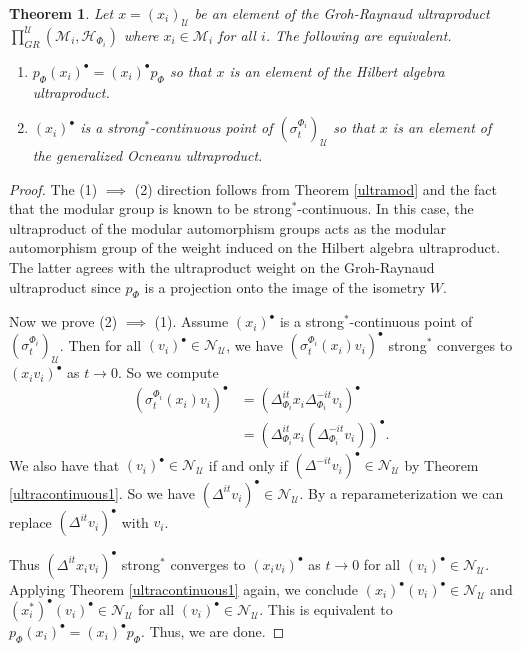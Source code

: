 \documentclass[12pt]{amsart}
\newtheorem{thm}{Theorem}[section]
\theoremstyle{definition}
\def\cal{\mathcal}
\newcommand\cU{{\cal U}}
\begin{document}
\begin{thm}\label{ultracontinuous2}
    Let $x = (x_i)_{\cU}$ be an element of the Groh-Raynaud ultraproduct $\prod^{\cU}_{GR} (\cal M_i, \cal H_{\Phi_i})$ where $x_i \in \cal M_i$ for all $i$.  The following are equivalent.
    \begin{enumerate}
        \item $p_{\Phi} (x_i)^\bullet = (x_i)^\bullet p_{\Phi}$ so that $x$ is an element of the Hilbert algebra ultraproduct.
        \item $(x_i)^\bullet$ is a strong$^*$-continuous point of $(\sigma^{\Phi_i}_t)_{\cU}$ so that $x$ is an element of the generalized Ocneanu ultraproduct.
    \end{enumerate}
\end{thm}

\begin{proof}
    The (1) $\implies$ (2) direction follows from Theorem \ref{ultramod} and the fact that the modular group is known to be strong$^*$-continuous.  In this case, the ultraproduct of the modular automorphism groups acts as the modular automorphism group of the weight induced on the Hilbert algebra ultraproduct.  The latter agrees with the ultraproduct weight on the Groh-Raynaud ultraproduct since $p_{\Phi}$ is a projection onto the image of the isometry $W$.

    Now we prove (2) $\implies$ (1).  Assume $(x_i)^\bullet$ is a strong$^*$-continuous point of $(\sigma^{\Phi_i}_t)_{\cU}$.  Then for all $(v_i)^\bullet \in \cal N_{\cU}$, we have $(\sigma_t^{\Phi_i}(x_i)v_i)^\bullet$ strong$^*$ converges to $(x_i v_i)^\bullet$ as $t \to 0$.  So we compute
    \begin{align}
        (\sigma_t^{\Phi_i}(x_i)v_i)^\bullet &= (\Delta_{\Phi_i}^{it} x_i \Delta_{\Phi_i}^{-it} v_i)^\bullet \nonumber \\
        &= (\Delta_{\Phi_i}^{it} x_i (\Delta_{\Phi_i}^{-it} v_i))^\bullet. \nonumber
    \end{align}
    We also have that $(v_i)^\bullet \in \cal N_{\cU}$ if and only if $(\Delta^{-it}v_i)^\bullet \in \cal N_{\cU}$ by Theorem \ref{ultracontinuous1}.  So we have $(\Delta^{it}v_i)^\bullet \in \cal N_{\cU}$.  By a reparameterization we can replace $(\Delta^{it}v_i)^\bullet$ with $v_i$.
    
    Thus $(\Delta^{it}x_iv_i)^\bullet$ strong$^*$ converges to $(x_i v_i)^\bullet$ as $t \to 0$ for all $(v_i)^\bullet \in \cal N_{\cU}$.  Applying Theorem \ref{ultracontinuous1} again, we conclude $(x_i)^\bullet(v_i)^\bullet \in \cal N_{\cU}$ and $(x_i^*)^\bullet(v_i)^\bullet \in \cal N_{\cU}$ for all $(v_i)^\bullet \in \cal N_{\cU}$.  This is equivalent to $p_{\Phi}(x_i)^\bullet = (x_i)^\bullet p_{\Phi}$.  Thus, we are done.
\end{proof}
\end{document}
